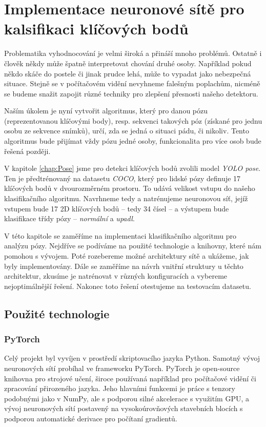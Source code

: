 \chapter{Implementace neuronové sítě pro kalsifikaci klíčových bodů}
\label{chap:ClassificationImplementation}

Problematika vyhodnocování je velmi široká a přináší mnoho problémů. Ostatně i
člověk někdy může špatně interpretovat chování druhé osoby. Například pokud
někdo skáče do postele či jinak prudce lehá, může to vypadat jako nebezpečná
situace. Stejně se v počítačovém vidění nevyhneme falešným poplachům, nicméně
se budeme snažit zapojit různé techniky pro zlepšení přesnosti našeho
detektoru.

Naším úkolem je nyní vytvořit algoritmus, který pro danou pózu (reprezentovanou
klíčovými body), resp. sekvenci takových póz (získané pro jednu osobu ze
sekvence snímků), určí, zda se jedná o situaci pádu, či nikoliv. Tento
algoritmus bude přijímat vždy pózu jedné osoby, funkcionalita pro více osob
bude řešená později.

V kapitole \ref{chap:Pose} jsme pro detekci klíčových bodů zvolili model
\textit{YOLO pose}. Ten je předtrénovaný na datasetu \textit{COCO}, který pro
lidské pózy definuje 17 klíčových bodů v dvourozměrném prostoru. To udává
velikost vstupu do našeho klasifikačního algoritmu. Navrhneme tedy a
natrénujeme neuronovou síť, jejíž vstupem bude 17 2D klíčových bodů – tedy 34
čísel – a výstupem bude klasifikace třídy pózy – \textit{normální} a
\textit{upadl}.

V této kapitole se zaměříme na implementaci klasifikačního algoritmu pro
analýzu pózy. Nejdříve se podíváme na použité technologie a knihovny, které nám
pomohou s vývojem. Poté rozebereme možné architektury sítě a ukážeme, jak byly
implementovány. Dále se zaměříme na návrh vnitřní struktury u těchto
architektur, zkusíme je natrénovat v různých konfiguracích a vybereme
nejoptimálnější řešení. Nakonec toto řešení otestujeme na testovacím datasetu.

\section{Použité technologie}

\subsection{PyTorch}

Celý projekt byl vyvíjen v prostředí skriptovacího jazyka Python. Samotný vývoj
neuronových sítí probíhal ve frameworku PyTorch. PyTorch je open-source
knihovna pro strojové učení, široce používaná například pro počítačové vidění
či zpracování přirozeného jazyka. Jeho hlavními funkcemi je práce s tenzory
podobnými jako v NumPy, ale s podporou silné akcelerace s využitím GPU, a vývoj
neuronových sítí postavený na vysokoúrovňových stavebních blocích s podporou
automatické derivace pro počítaní gradientů.


